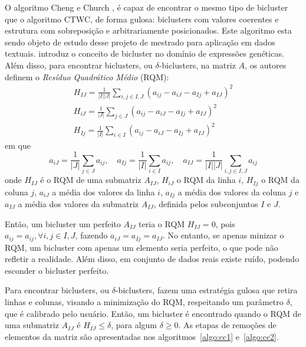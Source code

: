 \documentclass[normaltoc, espacoumemeio, pnumromarab,ruledheader]{abnt}
\begin{document}
O algoritmo Cheng e Church \cite{Cheng2000}, é capaz de encontrar o mesmo tipo de bicluster que o algoritmo CTWC, de forma gulosa: biclusters com valores coerentes e estrutura com sobreposição e arbitrariamente posicionados. Este algoritmo esta sendo objeto de estudo desse projeto de mestrado para aplicação em dados textuais.
 introduz o conceito de bicluster no domínio de expressões genéticas. Além disso, para encontrar biclusters, ou $\delta$-biclusters, na matriz $A$, os autores definem o \textit{Resíduo Quadrático Médio} (RQM):
\begin{equation}
\begin{split}
    H_{IJ} = \frac{1}{|I||J|} \displaystyle\sum_{i,j \in I,J} (a_{ij} - a_{iJ} - a_{Ij} + a_{IJ})^2 \\
    H_{iJ} = \frac{1}{|J|} \displaystyle\sum_{j \in J} (a_{ij} - a_{iJ} - a_{Ij} + a_{IJ})^2 \\
    H_{Ij} = \frac{1}{|I|} \displaystyle\sum_{i \in I} (a_{ij} - a_{iJ} - a_{Ij} + a_{IJ})^2
\end{split}
\end{equation}
em que
\begin{equation}
    a_{iJ} = \frac{1}{|J|} \displaystyle\sum_{j \in J} a_{ij},\quad a_{Ij} = \frac{1}{|I|} \displaystyle\sum_{i \in I} a_{ij},\quad a_{IJ} = \frac{1}{|I||J|} \displaystyle\sum_{i,j \in I,J} a_{ij}
\end{equation}
onde $H_{IJ}$ é o RQM de uma submatriz $A_{IJ}$, $H_{iJ}$ o RQM da linha $i$, $H_{Ij}$ o RQM da coluna $j$, $a_{iJ}$ a média dos valores da linha $i$, $a_{Ij}$ a média dos valores da coluna $j$ e $a_{IJ}$ a média dos valores da submatriz $A_{IJ}$, definida pelos subconjuntos $I$ e $J$.

Então, um bicluster um perfeito $A_{IJ}$ teria o RQM $H_{IJ} = 0$, pois $a_{ij} = a_{ij}, \forall i,j \in I,J$, fazendo $a_{iJ} = a_{Ij} = a_{IJ}$. No entanto, se apenas minizar o RQM, um bicluster com apenas um elemento seria perfeito, o que pode não refletir a realidade. Além disso, em conjunto de dados reais existe ruído, podendo esconder o bicluster perfeito.

Para encontrar biclusters, ou $\delta$-biclusters,  fazem uma estratégia gulosa que retira linhas e colunas, visando a minimização do RQM, respeitando um parâmetro $\delta$, que é calibrado pelo usuário. Então, um bicluster é encontrado quando o RQM de uma submatriz $A_{IJ}$ é $H_{IJ} \leq \delta$, para algum $\delta \geq 0$. As etapas de remoções de elementos da matriz são apresentadas nos algoritmos~\ref{algo:cc1} e~\ref{algo:cc2}.
\end{document}
